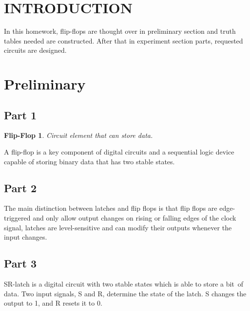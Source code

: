 \documentclass[pdftex,12pt,a4paper]{article}
\theoremstyle{plain}
\newtheorem*{ff}{Flip-Flop}
\begin{document}

\thispagestyle{empty}

\setcounter{tocdepth}{4}
\tableofcontents
\clearpage
\setcounter{page}{1}
\setcounter{subsubsection}{0}

\section{INTRODUCTION}
In this homework, flip-flops are thought over in preliminary section and truth tables needed are constructed. After that in experiment section parts, requested circuits are designed.

\section{Preliminary}
\subsection{Part 1}
\begin{ff}
  Circuit element that can store data.
\end{ff}
A flip-flop is a key component of digital circuits and a sequential logic device capable of storing binary data that has two stable states.

\subsection{Part 2}
The main distinction between latches and flip flops is that flip flops are edge-triggered and only allow output changes on rising or falling edges of the clock signal, latches are level-sensitive and can modify their outputs whenever the input changes.

\subsection{Part 3}
SR-latch is a digital circuit with two stable states which is able to store a bit of data. Two input signals, S and R, determine the state of the latch. S changes the output to 1, and R resets it to 0.
\end{document}
